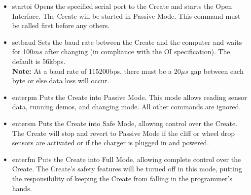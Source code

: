 \documentclass {article}
\begin{document}
\begin {itemize}
  \item {} {startoi}
        Opens the specified serial port to the Create and starts the Open Interface.  The Create
        will be started in Passive Mode.  This command must be called first before any others. \\
        \retnorm
        
  \item {} {setbaud}
        Sets the baud rate between the Create and the computer and waits for 100$ms$ after changing
        (in compliance with the OI specification).  The default is 56kbps. \\
        {\bf Note:}  At a baud rate of 115200bps, there must be a 20$\mu s$ gap between each byte
        or else data loss will occur. \\
        \retnorm

  \item {} {enterpm}
        Puts the Create into Passive Mode.  This mode allows reading sensor data, running demos, and
        changing mode.  All other commands are ignored. \\ 
        \retnorm

  \item {} {entersm}
        Puts the Create into Safe Mode, allowing control over the Create.  The Create will stop and
        revert to Passive Mode if the cliff or wheel drop sensors are activated or if the charger is
        plugged in and powered. \\
        \retnorm

  \item {} {enterfm}
        Puts the Create into Full Mode, allowing complete control over the Create.  The Create's
        safety features will be turned off in this mode, putting the responsibility of keeping the
        Create from falling in the programmer's hands. \\
        \retnorm


\end{itemize}
\end{document}
